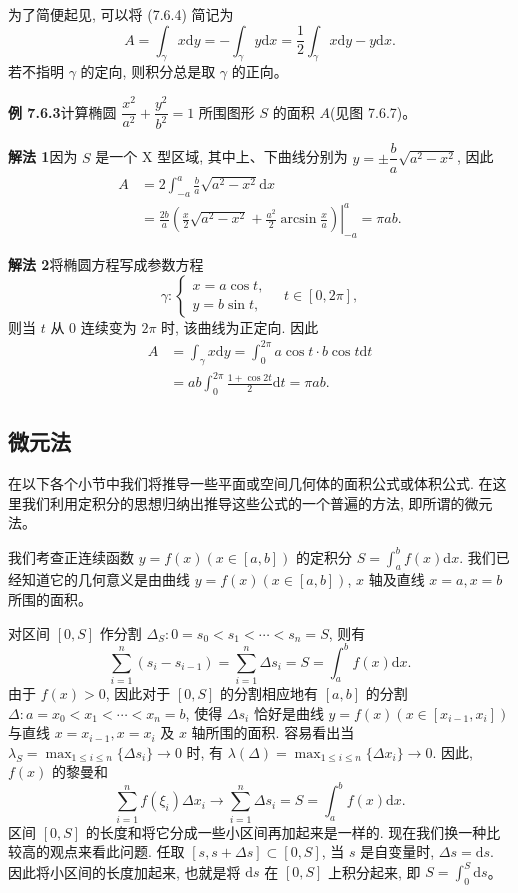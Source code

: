 \documentclass[UTF8, 12pt, fontset=fandol, oneside]{ctexart}
\begin{document}
为了简便起见, 可以将 (7.6.4) 简记为
\[
  A=\int_\gamma x\mathrm dy=-\int_\gamma y\mathrm dx
  =\frac{1}{2}\int_\gamma x\mathrm dy-y\mathrm dx.
\]
若不指明 $\gamma$ 的定向, 则积分总是取 $\gamma$ 的正向。

\noindent\textbf{例 7.6.3}\quad 计算椭圆 $\dfrac{x^2}{a^2}+\dfrac{y^2}{b^2}=1$ 所围图形 $S$ 的面积 $A$(见图 7.6.7)。

\noindent\textbf{解法 1}\quad 因为 $S$ 是一个 X 型区域, 其中上、下曲线分别为 $y=\pm\dfrac{b}{a}\sqrt{a^2-x^2}$, 因此
\[
\begin{aligned}
  A&=2\int_{-a}^a\frac{b}{a}\sqrt{a^2-x^2}\mathrm dx\\
  &=\frac{2b}{a}\left.\left(\frac{x}{2}\sqrt{a^2-x^2}
  +\frac{a^2}{2}\arcsin\frac{x}{a}\right)\right|_{-a}^a
  =\pi ab.
\end{aligned}
\]

\noindent\textbf{解法 2}\quad 将椭圆方程写成参数方程
\[
  \gamma:
  \begin{cases}
    x=a\cos t,\\
    y=b\sin t,
  \end{cases}
  \quad t\in[0,2\pi],
\]
则当 $t$ 从 $0$ 连续变为 $2\pi$ 时, 该曲线为正定向. 因此
\[
\begin{aligned}
  A&=\int_\gamma x\mathrm dy
  =\int_0^{2\pi}a\cos t\cdot b\cos t\mathrm dt\\
  &=ab\int_0^{2\pi}\frac{1+\cos2t}{2}\mathrm dt
  =\pi ab.
\end{aligned}
\]

\subsection{微元法}

在以下各个小节中我们将推导一些平面或空间几何体的面积公式或体积公式. 在这里我们利用定积分的思想归纳出推导这些公式的一个普遍的方法, 即所谓的微元法。

我们考查正连续函数 $y=f(x)(x\in[a,b])$ 的定积分 $S=\int_a^b f(x)\mathrm dx$. 我们已经知道它的几何意义是由曲线 $y=f(x)(x\in[a,b])$, $x$ 轴及直线 $x=a,x=b$ 所围的面积。

对区间 $[0,S]$ 作分割 $\Delta_S:0=s_0<s_1<\cdots<s_n=S$, 则有
\begin{equation}
  \sum_{i=1}^n(s_i-s_{i-1})=\sum_{i=1}^n\Delta s_i=S=\int_a^b f(x)\mathrm dx.
  \tag{7.6.5}
\end{equation}
由于 $f(x)>0$, 因此对于 $[0,S]$ 的分割相应地有 $[a,b]$ 的分割 $\Delta:a=x_0<x_1<\cdots<x_n=b$, 使得 $\Delta s_i$ 恰好是曲线 $y=f(x)(x\in[x_{i-1},x_i])$ 与直线 $x=x_{i-1},x=x_i$ 及 $x$ 轴所围的面积. 容易看出当 $\lambda_S=\max_{1\leq i\leq n}\{\Delta s_i\}\to0$ 时, 有 $\lambda(\Delta)=\max_{1\leq i\leq n}\{\Delta x_i\}\to0$. 因此, $f(x)$ 的黎曼和
\begin{equation}
  \sum_{i=1}^n f(\xi_i)\Delta x_i\to\sum_{i=1}^n\Delta s_i=S=\int_a^b f(x)\mathrm dx.
  \tag{7.6.6}
\end{equation}
区间 $[0,S]$ 的长度和将它分成一些小区间再加起来是一样的. 现在我们换一种比较高的观点来看此问题. 任取 $[s,s+\Delta s]\subset[0,S]$, 当 $s$ 是自变量时, $\Delta s=\mathrm ds$. 因此将小区间的长度加起来, 也就是将 $\mathrm ds$ 在 $[0,S]$ 上积分起来, 即 $S=\int_0^S\mathrm ds$。
\end{document}
